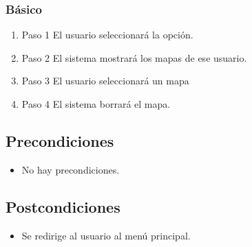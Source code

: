 \subsubsection{Básico}

\begin{enumerate}
\item Paso 1
El usuario seleccionará la opción.
\item Paso 2
El sistema mostrará los mapas de ese usuario.
\item Paso 3
El usuario seleccionará un mapa
\item Paso 4
El sistema borrará el mapa.
\end{enumerate}

\subsection{Precondiciones}
\begin{itemize}
\item No hay precondiciones.
\end{itemize}
\subsection{Postcondiciones}
\begin{itemize}
\item Se redirige al usuario al menú principal.
\end{itemize}